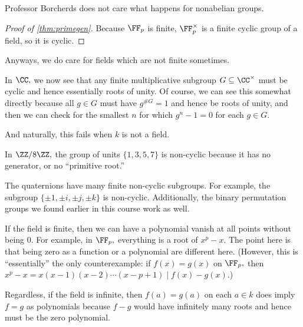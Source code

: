 \documentclass[../notes.tex]{subfiles}
\begin{document}
\begin{remark}
	Professor Borcherds does not care what happens for nonabelian groups.
\end{remark}
\begin{proof}[Proof of \autoref{thm:primegen}]
	Because $\FF_p$ is finite, $\FF_p^\times$ is a finite cyclic group of a field, so it is cyclic.
\end{proof}
Anyways, we do care for fields which are not finite sometimes.
\begin{example}
	In $\CC,$ we now see that any finite multiplicative subgroup $G\subseteq\CC^\times$ must be cyclic and hence essentially roots of unity. Of course, we can see this somewhat directly because all $g\in G$ must have $g^{\#G}=1$ and hence be roots of unity, and then we can check for the smallest $n$ for which $g^n-1=0$ for each $g\in G.$
\end{example}
And naturally, this fails when $k$ is not a field.
\begin{nex}
	In $\ZZ/8\ZZ,$ the group of units $\{1,3,5,7\}$ is non-cyclic because it has no generator, or no ``primitive root.''
\end{nex}
\begin{nex}
	The quaternions have many finite non-cyclic subgroups. For example, the subgroup $\{\pm1,\pm i,\pm j,\pm k\}$ is non-cyclic. Additionally, the binary permutation groups we found earlier in this course work as well.
\end{nex}
\begin{remark}
	If the field is finite, then we can have a polynomial vanish at all points without being $0.$ For example, in $\FF_p,$ everything is a root of $x^p-x.$ The point here is that being zero as a function or a polynomial are different here. (However, this is ``essentially'' the only counterexample: if $f(x)=g(x)$ on $\FF_p,$ then $x^p-x=x(x-1)(x-2)\cdots(x-p+1)\mid f(x)-g(x).$)
\end{remark}
Regardless, if the field is infinite, then $f(a)=g(a)$ on each $a\in k$ does imply $f=g$ as polynomials because $f-g$ would have infinitely many roots and hence must be the zero polynomial.
\end{document}
